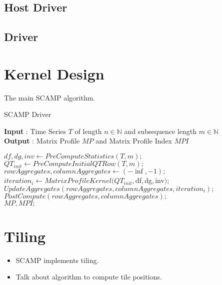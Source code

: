 \subsection{Host Driver}
\subsection{Driver}

\section{Kernel Design}

The main SCAMP algorithm.

\begin{algorithm}
\caption{SCAMP Driver}\label{alg:SCAMP}
    \hspace*{\algorithmicindent} \textbf{Input} : Time Series $T$ of length \( n \in \mathbb{N} \) and subsequence length  \( m \in \mathbb{N} \) \\
    \hspace*{\algorithmicindent} \textbf{Output} : Matrix Profile $MP$ and Matrix Profile Index $MPI$
    \begin{algorithmic}[1]
        \State $df,dg,inv \gets PreComputeStatistics(T, m);$
        \State $QT_{init} \gets PreComputeInitialQTRow(T, m);$
        \State $rowAggregates, columnAggregates \gets (-\inf, -1);$
            \State $iteration_i \gets MatrixProfileKernel(QT_{init}, $df$, $dg$, $inv$);$
            \State $UpdateAggregates(rowAggregates, columnAggregates, iteration_i);$
        \EndFor
        \State $PostCompute(rowAggregates, columnAggregates);$\\
        \Return $MP, MPI;$
    \end{algorithmic}
\end{algorithm}
    
\section{Tiling}

\begin{itemize}
    \item SCAMP implements tiling.
    \item Talk about algorithm to compute tile positions.
\end{itemize}

